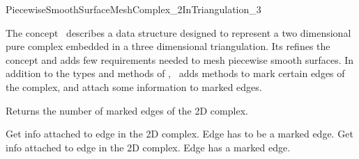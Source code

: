 

\begin{ccRefConcept}{PiecewiseSmoothSurfaceMeshComplex_2InTriangulation_3}


\ccDefinition
  
The concept \ccRefName\ describes a data structure
designed  to represent a  two dimensional pure complex 
embedded in a three dimensional triangulation. Its refines the concept
 and adds few requirements
needed to mesh piecewise smooth surfaces. In addition to the types and methods
of , \ccRefName\ adds methods to mark
certain edges of the complex, and attach some information to marked edges.

\ccGeneralizes
{}

\ccTypes
{}



\ccGlue
{}

{Returns the number of marked edges of the 2D complex.}

{Get info attached
to edge  in the 2D complex.
\ccPrecond Edge  has to be a marked edge.}
\ccGlue
{}
{Get info attached
to edge  in the 2D complex.
\ccPrecond Edge  has a marked edge.}





\end{ccRefConcept}
